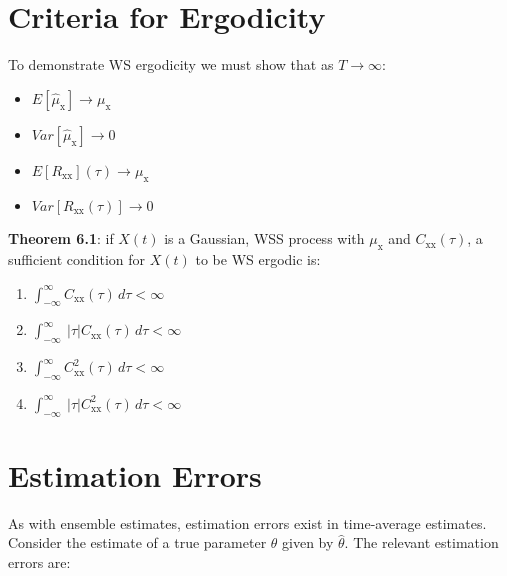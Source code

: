 \documentclass[12pt]{book}
\theoremstyle{definition}
\begin{document}
\section{Criteria for Ergodicity}
To demonstrate WS ergodicity we must show that as \(T \rightarrow \infty\):

\begin{itemize}
    \item \(E[\hat{\mu}_\mathrm{x}] \rightarrow \mu_\mathrm{x} \)
    \item \(Var[\hat{\mu}_\mathrm{x}] \rightarrow 0\)
     \item \(E[R_\mathrm{xx}](\tau) \rightarrow \mu_\mathrm{x} \)
    \item \(Var[R_\mathrm{xx}(\tau)] \rightarrow 0\)
\end{itemize}

\textbf{Theorem 6.1}: if $X(t)$ is a Gaussian, WSS process with $\mu_\mathrm{x}$ and $C_\mathrm{xx}(\tau)$, a sufficient condition for \(X(t)\) to be WS ergodic is:

\begin{enumerate}
    \item \( \int_{-\infty}^\infty C_\mathrm{xx}(\tau) \, d \tau < \infty \)
    \item \( \int_{-\infty}^\infty \ | \tau | C_\mathrm{xx}(\tau) \, d \tau < \infty \)
        \item \( \int_{-\infty}^\infty C^2_\mathrm{xx}(\tau) \, d \tau < \infty \)
    \item \( \int_{-\infty}^\infty \ | \tau | C^2_\mathrm{xx}(\tau) \, d \tau < \infty \)
\end{enumerate}

\section{Estimation Errors}

As with ensemble estimates, estimation errors exist in time-average estimates. Consider the estimate of a true parameter \(\theta\) given by  \(\hat{\theta}\). The relevant estimation errors are:
\end{document}
